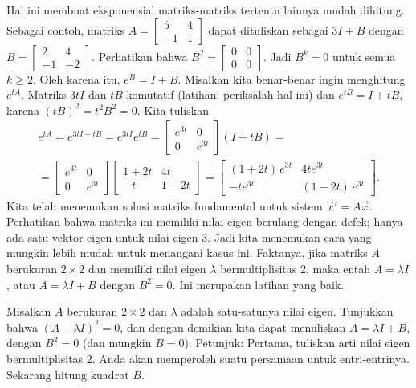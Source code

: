 Hal ini membuat eksponensial matriks-matriks tertentu lainnya mudah dihitung.  
Sebagai contoh, matriks
$A = \left[ \begin{smallmatrix} 5 & 4 \\ -1 & 1 \end{smallmatrix} \right]$
dapat dituliskan sebagai
$3I + B$ dengan
$B = \left[ \begin{smallmatrix} 2 & 4 \\ -1 & -2 \end{smallmatrix} \right]$.
Perhatikan bahwa $B^2 = 
\left[ \begin{smallmatrix} 0 & 0 \\ 0 & 0 \end{smallmatrix} \right]$.  Jadi
$B^k = 0$ untuk semua $k \geq 2$.  Oleh karena itu, $e^B = I + B$.  Misalkan kita
benar-benar ingin menghitung $e^{tA}$.  Matriks $3tI$ dan $tB$ komutatif
(latihan: periksalah hal ini)
dan $e^{tB} = I + tB$, karena ${(tB)}^2 = t^2 B^2 = 0$.
Kita tuliskan
\begin{multline*}
e^{tA} = 
e^{3tI + tB} = e^{3tI} e^{tB} = 
\begin{bmatrix} e^{3t} & 0 \\ 0 & e^{3t} \end{bmatrix}
\left(
I + tB
\right)
=
\\
=
\begin{bmatrix} e^{3t} & 0 \\ 0 & e^{3t} \end{bmatrix}
\begin{bmatrix} 1+2t & 4t \\ -t & 1-2t \end{bmatrix}
=
\begin{bmatrix} (1+2t)\,e^{3t} & 4te^{3t} \\ -te^{3t} & (1-2t)\,e^{3t} \end{bmatrix} .
\end{multline*}
Kita telah menemukan solusi matriks fundamental untuk
sistem ${\vec{x}}' = A \vec{x}$.  Perhatikan bahwa matriks ini memiliki nilai eigen
berulang dengan defek; hanya ada satu vektor eigen untuk nilai eigen
3.  Jadi kita menemukan cara yang mungkin lebih mudah untuk menangani kasus ini.  Faktanya, jika
matriks $A$ berukuran $2 \times 2$ dan memiliki nilai eigen $\lambda$ bermultiplisitas
2, maka
entah $A = \lambda I$, atau $A = \lambda I + B$ dengan $B^2 = 0$.  Ini merupakan
latihan yang baik.

\begin{exercise}%
Misalkan $A$ berukuran $2 \times 2$ dan $\lambda$
adalah satu-satunya nilai eigen.  Tunjukkan bahwa ${(A - \lambda I)}^2 = 0$, dan dengan demikian
kita dapat menuliskan $A = \lambda I + B$, dengan $B^2 = 0$ (dan mungkin $B=0$).
Petunjuk: Pertama,
tuliskan arti nilai eigen bermultiplisitas 2.
Anda akan memperoleh
suatu persamaan untuk entri-entrinya.  Sekarang hitung kuadrat $B$.
\end{exercise}

